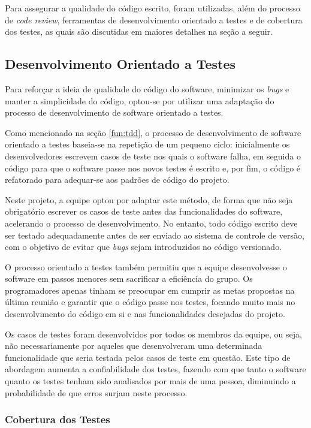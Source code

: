 Para assegurar a qualidade do código escrito, foram utilizadas, além do processo de \emph{code review}, ferramentas de desenvolvimento orientado a testes e de cobertura dos testes, as quais são discutidas em maiores detalhes na seção a seguir.

\subsection{Desenvolvimento Orientado a Testes}

Para reforçar a ideia de qualidade do código do software, minimizar os \emph{bugs} e manter a simplicidade do código, optou-se por utilizar uma adaptação do processo de desenvolvimento de software orientado a testes.

Como mencionado na seção \ref{fun:tdd}, o processo de desenvolvimento de software orientado a testes baseia-se na repetição de um pequeno ciclo: inicialmente os desenvolvedores escrevem casos de teste nos quais o software falha, em seguida o código para que o software passe nos novos testes é escrito e, por fim, o código é refatorado para adequar-se aos padrões de código do projeto.

Neste projeto, a equipe optou por adaptar este método, de forma que não seja obrigatório escrever os casos de teste antes das funcionalidades do software, acelerando o processo de desenvolvimento.
No entanto, todo código escrito deve ser testado adequadamente antes de ser enviado ao sistema de controle de versão, com o objetivo de evitar que \emph{bugs} sejam introduzidos no código versionado.

O processo orientado a testes também permitiu que a equipe desenvolvesse o software em passos menores sem sacrificar a eficiência do grupo.
Os programadores apenas tinham se preocupar em cumprir as metas propostas na última reunião e garantir que o código passe nos testes, focando muito mais no desenvolvimento do código em si e nas funcionalidades desejadas do projeto.

Os casos de testes foram desenvolvidos por todos os membros da equipe, ou seja, não necessariamente por aqueles que desenvolveram uma determinada funcionalidade que seria testada pelos casos de teste em questão.
Este tipo de abordagem aumenta a confiabilidade dos testes, fazendo com que tanto o software quanto os testes tenham sido analisados por mais de uma pessoa, diminuindo a probabilidade de que erros surjam neste processo.


\subsubsection{Cobertura dos Testes}

